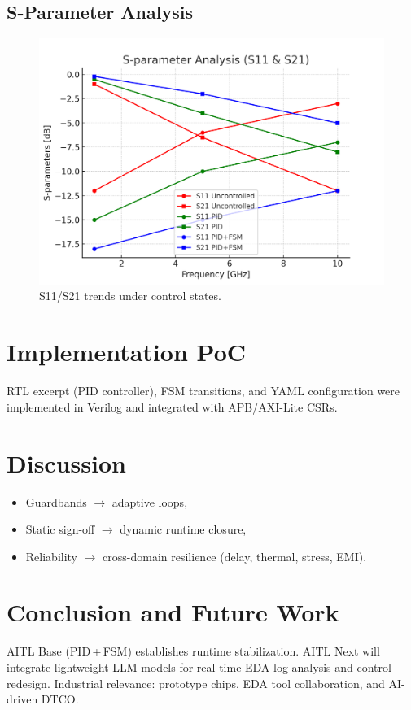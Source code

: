 \documentclass[conference]{IEEEtran}
\begin{document}
\subsection{S-Parameter Analysis}
\begin{figure}[!t]
\centering
\includegraphics[width=.95\columnwidth]{figs/sparam_s11s21.png}
\caption{S11/S21 trends under control states.}
\label{fig:sparam}
\end{figure}

\section{Implementation PoC}
RTL excerpt (PID controller), FSM transitions, and YAML configuration were implemented in Verilog and integrated with APB/AXI-Lite CSRs.

\section{Discussion}
\begin{itemize}
\item Guardbands $\rightarrow$ adaptive loops,
\item Static sign-off $\rightarrow$ dynamic runtime closure,
\item Reliability $\rightarrow$ cross-domain resilience (delay, thermal, stress, EMI).
\end{itemize}

\section{Conclusion and Future Work}
AITL Base (PID\,+\,FSM) establishes runtime stabilization. AITL Next will integrate lightweight LLM models for real-time EDA log analysis and control redesign. Industrial relevance: prototype chips, EDA tool collaboration, and AI-driven DTCO.
\end{document}
